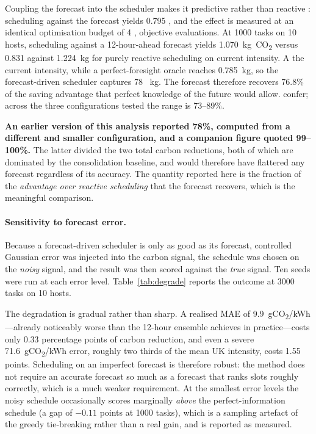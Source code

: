 \documentclass[12pt,a4paper]{article}
\providecommand{\DIFaddtex}[1]{{\protect\color{blue} \sf #1}} %
\providecommand{\DIFdeltex}[1]{{\protect\color{red} \scriptsize #1}} %
\providecommand{\DIFaddbegin}{} %
\providecommand{\DIFaddend}{} %
\providecommand{\DIFdelbegin}{} %
\providecommand{\DIFdelend}{} %
\providecommand{\DIFadd}[1]{\texorpdfstring{\DIFaddtex{#1}}{#1}} %
\providecommand{\DIFdel}[1]{\texorpdfstring{\DIFdeltex{#1}}{}} %
\providecommand{\DIFscaledelfig}{0.5}
\newlength{\DIFdelgraphicswidth} %
\newlength{\DIFdelgraphicsheight} %
\providecommand{\DIFaddincludegraphics}[2][]{{\color{blue}\fbox{\DIFOincludegraphics[#1]{#2}}}} %
\providecommand{\DIFdelincludegraphics}[2][]{%
\sbox{\DIFdelgraphicsbox}{\DIFOincludegraphics[#1]{#2}}%
\settoboxwidth{\DIFdelgraphicswidth}{\DIFdelgraphicsbox} %
\settoboxtotalheight{\DIFdelgraphicsheight}{\DIFdelgraphicsbox} %
\scalebox{\DIFscaledelfig}{%
\parbox[b]{\DIFdelgraphicswidth}{\usebox{\DIFdelgraphicsbox}\\[-\baselineskip] \rule{\DIFdelgraphicswidth}{0em}}\llap{\resizebox{\DIFdelgraphicswidth}{\DIFdelgraphicsheight}{%
\setlength{\unitlength}{\DIFdelgraphicswidth}%
\begin{picture}(1,1)%
\thicklines\linethickness{2pt} %
{\color[rgb]{1,0,0}\put(0,0){\framebox(1,1){}}}%
{\color[rgb]{1,0,0}\put(0,0){\line( 1,1){1}}}%
{\color[rgb]{1,0,0}\put(0,1){\line(1,-1){1}}}%
\end{picture}%
}\hspace*{3pt}}} %
} %
\DeclareRobustCommand{\DIFaddbegin}{\DIFOaddbegin \let\includegraphics\DIFaddincludegraphics} %
\DeclareRobustCommand{\DIFaddend}{\DIFOaddend \let\includegraphics\DIFOincludegraphics} %
\DeclareRobustCommand{\DIFdelbegin}{\DIFOdelbegin \let\includegraphics\DIFdelincludegraphics} %
\DeclareRobustCommand{\DIFdelend}{\DIFOaddend \let\includegraphics\DIFOincludegraphics} %
\begin{document}
\DIFaddend Coupling the forecast into the scheduler makes it predictive rather than reactive\DIFdelbegin \DIFdel{: scheduling
against the forecast yields 0.795}\DIFdelend \DIFaddbegin \DIFadd{, and the effect is measured
at an identical optimisation budget of 4}{\DIFadd{,}}\DIFadd{840 objective evaluations. At 1000 tasks on 10 hosts, scheduling
against a 12-hour-ahead forecast yields 1.070}\DIFaddend ~kg~CO\textsubscript{2} \DIFdelbegin \DIFdel{versus 0.831}\DIFdelend \DIFaddbegin \DIFadd{against 1.224}\DIFaddend ~kg for \DIFaddbegin \DIFadd{purely }\DIFaddend reactive
scheduling on \DIFdelbegin \DIFdel{current intensity. A }\DIFdelend \DIFaddbegin \DIFadd{the current intensity, while a }\DIFaddend perfect-foresight oracle reaches \DIFdelbegin \DIFdel{0.785~kg, so the forecast-driven scheduler captures 78}\DIFdelend \DIFaddbegin \DIFadd{1.024~kg. The forecast therefore
recovers 76.8}\DIFaddend \% of the \DIFdelbegin \DIFdel{saving }\DIFdelend \DIFaddbegin \DIFadd{advantage }\DIFaddend that perfect knowledge of the future would \DIFdelbegin \DIFdel{allow.
}\DIFdelend \DIFaddbegin \DIFadd{confer; across the three
configurations tested the range is 73--89\%.
}

\DIFadd{\textbf{An earlier version of this analysis reported 78\%, computed from a different and smaller
configuration, and a companion figure quoted 99--100\%.} The latter divided the two total carbon reductions,
both of which are dominated by the consolidation baseline, and would therefore have flattered any forecast
regardless of its accuracy. The quantity reported here is the fraction of the \emph{advantage over reactive
scheduling} that the forecast recovers, which is the meaningful comparison.
}

\paragraph{\DIFadd{Sensitivity to forecast error.}} \DIFadd{Because a forecast-driven scheduler is only as good as its
forecast, controlled Gaussian error was injected into the carbon signal, the schedule was chosen on the
\emph{noisy} signal, and the result was then scored against the \emph{true} signal. Ten seeds were run at each
error level. Table~\ref{tab:degrade} reports the outcome at 3000 tasks on 10 hosts.
}

\DIFadd{The degradation is gradual rather than sharp. A realised MAE of 9.9~gCO\textsubscript{2}/kWh---already
noticeably worse than the 12-hour ensemble achieves in practice---costs only 0.33 percentage points of carbon
reduction, and even a severe 71.6~gCO\textsubscript{2}/kWh error, roughly two thirds of the mean UK intensity,
costs 1.55 points. Scheduling on an imperfect forecast is therefore robust: the method does not require an
accurate forecast so much as a forecast that ranks slots roughly correctly, which is a much weaker
requirement. At the smallest error levels the noisy schedule occasionally scores marginally \emph{above} the
perfect-information schedule (a gap of $-0.11$ points at 1000 tasks), which is a sampling artefact of the
greedy tie-breaking rather than a real gain, and is reported as measured.
}
\end{document}
